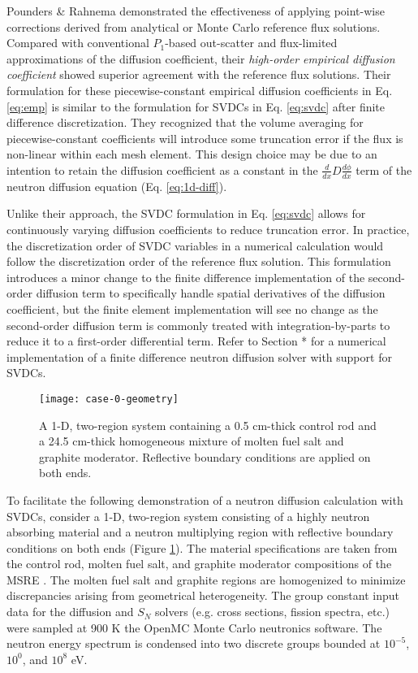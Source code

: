 Pounders \& Rahnema \cite{pounders_diffusion_2009} demonstrated the effectiveness of applying
point-wise corrections derived from analytical or Monte Carlo reference flux solutions. Compared
with conventional $P_1$-based out-scatter and flux-limited approximations of the diffusion
coefficient, their \textit{high-order empirical diffusion coefficient} showed superior agreement
with the reference flux solutions. Their formulation for these piecewise-constant empirical
diffusion coefficients in Eq. \ref{eq:emp} is similar to the formulation for \glspl{SVDC} in Eq.
\ref{eq:svdc} after finite difference discretization. They recognized that the volume
averaging for piecewise-constant coefficients will introduce some truncation error if the flux is
non-linear within each mesh element. This design choice may be due to an intention to retain the
diffusion coefficient as a constant in the $\frac{d}{dx}D\frac{d\phi}{dx}$ term of the neutron
diffusion equation (Eq. \ref{eq:1d-diff}).

Unlike their approach, the \gls{SVDC} formulation in Eq. \ref{eq:svdc} allows for continuously
varying diffusion coefficients to reduce truncation error. In practice, the discretization order of
\gls{SVDC} variables in a numerical calculation would follow the discretization order of the
reference flux solution. This formulation introduces a minor change to the finite difference
implementation of the second-order diffusion term to specifically handle spatial derivatives of the
diffusion coefficient, but the finite element implementation will see no change as the second-order
diffusion term is commonly treated with integration-by-parts to reduce it to a first-order
differential term. Refer to Section * for a numerical implementation of a finite difference neutron
diffusion solver with support for \glspl{SVDC}.

\begin{figure}[htb!]
  \centering
  \texttt{[image: case-0-geometry]}
  \caption{A 1-D, two-region system containing a 0.5 cm-thick control rod and a 24.5 cm-thick
    homogeneous mixture of molten fuel salt and graphite moderator. Reflective boundary conditions
    are applied on both ends.}
  \label{fig:case-0-geom}
\end{figure}

To facilitate the following demonstration of a neutron diffusion calculation with \glspl{SVDC},
consider a 1-D, two-region system consisting of a highly neutron absorbing material and a neutron
multiplying region with reflective boundary conditions on both ends (Figure \ref{fig:case-0-geom}).
The material specifications are taken from the control rod, molten fuel salt, and graphite
moderator compositions of the \gls{MSRE} \cite{robertson_msre_1965}. The molten fuel salt and
graphite regions are homogenized to minimize discrepancies arising from geometrical heterogeneity.
The group constant input data for the diffusion and $S_N$ solvers (e.g. cross sections, fission
spectra, etc.) were sampled at 900 K the OpenMC Monte Carlo neutronics software. The neutron energy
spectrum is condensed into two discrete groups bounded at $10^{-5}$, $10^0$, and $10^8$ eV.

